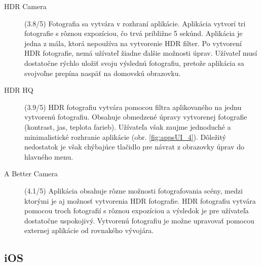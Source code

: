 \begin{description}
    \item [HDR Camera] (3.8/5)
    Fotografia sa vytvára v rozhraní aplikácie. Aplikácia vytvorí tri fotografie s rôznou expozíciou, čo trvá
    približne 5 sekúnd. Aplikácia je jedna z mála, ktorá nepoužíva na vytvorenie HDR filter. Po vytvorení HDR
    fotografie, nemá užívateľ žiadne ďalšie možnosti úprav. Užívateľ musí dostatočne rýchlo uložiť svoju výslednú
    fotografiu, pretože aplikácia sa svojvoľne prepína naspäť na domovskú obrazovku.

    \item [HDR HQ] (3.9/5)
    HDR fotografiu vytvára pomocou filtra aplikovaného na jednu vytvorenú fotografiu. Obsahuje obmedzené úpravy
    vytvorenej fotografie (kontrast, jas, teplota farieb). Užívateľa však zaujme jednoduché a minimalistické
    rozhranie aplikácie (obr. \ref{fig:appsUI_4}). Dôležitý nedostatok je však chýbajúce tlačidlo pre návrat
    z obrazovky úprav do hlavného menu.

    \item [A Better Camera] (4.1/5)
    Aplikácia obsahuje rôzne možnosti fotografovania scény, medzi ktorými je aj možnosť vytvorenia HDR fotografie.
    HDR fotografiu vytvára pomocou troch fotografií s rôznou expozíciou a výsledok je pre užívateľa dostatočne uspokojivý.
    Vytvorenú fotografiu je možne upravovať pomocou externej aplikácie od rovnakého vývojára.

\end{description}

\subsection*{iOS}

